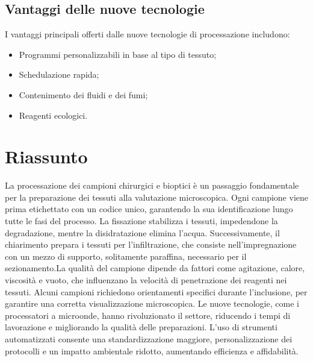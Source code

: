 \subsection{Vantaggi delle nuove tecnologie}
I vantaggi principali offerti dalle nuove tecnologie di processazione includono:
\begin{itemize}
    \item Programmi personalizzabili in base al tipo di tessuto;
    \item Schedulazione rapida;
    \item Contenimento dei fluidi e dei fumi;
    \item Reagenti ecologici.
\end{itemize}

\section{Riassunto}
La processazione dei campioni chirurgici e bioptici è un passaggio fondamentale per la preparazione dei tessuti alla valutazione microscopica. Ogni campione viene prima etichettato con un codice unico, garantendo la sua identificazione lungo tutte le fasi del processo. La fissazione stabilizza i tessuti, impedendone la degradazione, mentre la disidratazione elimina l'acqua. Successivamente, il chiarimento prepara i tessuti per l'infiltrazione, che consiste nell'impregnazione con un mezzo di supporto, solitamente paraffina, necessario per il sezionamento.La qualità del campione dipende da fattori come agitazione, calore, viscosità e vuoto, che influenzano la velocità di penetrazione dei reagenti nei tessuti. Alcuni campioni richiedono orientamenti specifici durante l'inclusione, per garantire una corretta visualizzazione microscopica. Le nuove tecnologie, come i processatori a microonde, hanno rivoluzionato il settore, riducendo i tempi di lavorazione e migliorando la qualità delle preparazioni. L'uso di strumenti automatizzati consente una standardizzazione maggiore, personalizzazione dei protocolli e un impatto ambientale ridotto, aumentando efficienza e affidabilità.
